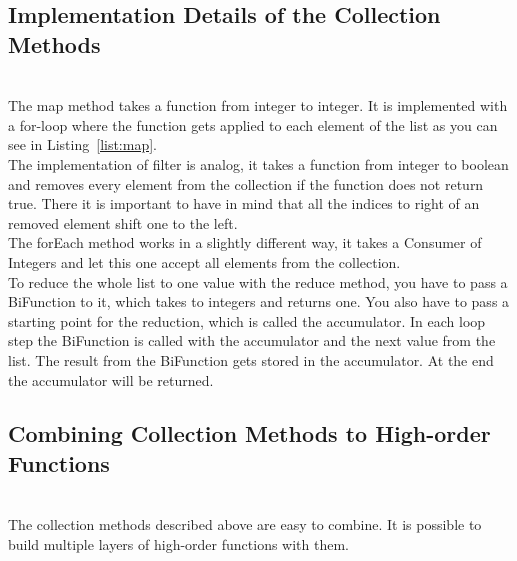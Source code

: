 \documentclass[runningheads,a4paper]{llncs}
\begin{document}
\subsection{Implementation Details of the Collection Methods}
\lstset{caption=Implementation of the map() and filter() method., label=list:map}

\\
The map method takes a function from integer to integer.
It is implemented with a for-loop where the function gets applied to each element of the list as you can see in Listing~\ref{list:map}. \\
The implementation of filter is analog, it takes a function from integer to boolean and removes every element from the collection if the function does not return true.
There it is important to have in mind that all the indices to right of an removed element shift one to the left.\\
The forEach method works in a slightly different way, it takes a Consumer of Integers and let this one accept all elements from the collection.\\
To reduce the whole list to one value with the reduce method, you have to pass a BiFunction to it, which takes to integers and returns one.
You also have to pass a starting point for the reduction, which is called the accumulator. In each loop step the BiFunction is called with the accumulator and the next value from the list.
The result from the BiFunction gets stored in the accumulator. At the end the accumulator will be returned.
\\
\subsection{Combining Collection Methods to High-order Functions}\\
The collection methods described above are easy to combine. It is possible to build multiple layers of high-order functions with them.\\
\end{document}
